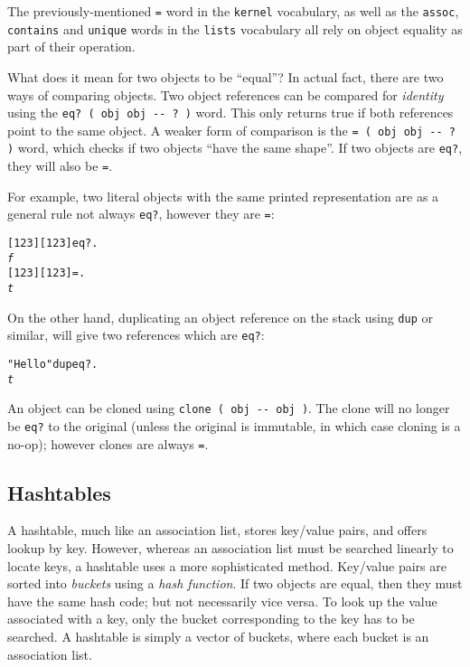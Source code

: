 \documentclass[english]{article}
\begin{document}
The previously-mentioned \texttt{=} word in the \texttt{kernel} vocabulary, as well as the \texttt{assoc}, \texttt{contains} and \texttt{unique} words in the \texttt{lists} vocabulary all rely on object equality as part of their operation.

What does it mean for two objects to be ``equal''? In actual fact, there are two ways of comparing objects. Two object references can be compared for \emph{identity} using the \texttt{eq? ( obj obj -{}- ? )} word. This only returns true if both references point to the same object. A weaker form of comparison is the \texttt{= ( obj obj -{}- ? )} word, which checks if two objects ``have the same shape''.
If two objects are \texttt{eq?}, they will also be \texttt{=}.

For example, two literal objects with the same printed representation are as a general rule not always \texttt{eq?}, however they are \texttt{=}:

\begin{alltt}
{[} 1 2 3 {]} {[} 1 2 3 {]} eq? .
\emph{f}
{[} 1 2 3 {]} {[} 1 2 3 {]} = .
\emph{t}
\end{alltt}

On the other hand, duplicating an object reference on the stack using \texttt{dup} or similar, will give two references which are \texttt{eq?}:

\begin{alltt}
"Hello" dup eq? .
\emph{t}
\end{alltt}

An object can be cloned using \texttt{clone ( obj -{}- obj )}. The clone will no longer be \texttt{eq?} to the original (unless the original is immutable, in which case cloning is a no-op); however clones are always \texttt{=}.

\subsection{Hashtables}

A hashtable, much like an association list, stores key/value pairs, and offers lookup by key. However, whereas an association list must be searched linearly to locate keys, a hashtable uses a more sophisticated method. Key/value pairs are sorted into \emph{buckets} using a \emph{hash function}. If two objects are equal, then they must have the same hash code; but not necessarily vice versa. To look up the value associated with a key, only the bucket corresponding to the key has to be searched. A hashtable is simply a vector of buckets, where each bucket is an association list.
\end{document}
